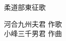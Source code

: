 \documentclass[10pt,b5j]{tarticle} %
\begin{document}
\begin{minipage}[c]{0.7\hsize} %
    \begin{center}
        {\LARGE
            柔道部東征歌 %
        }
        {\small 
        }
    \end{center}
\end{minipage}
\begin{minipage}[c]{0.3\hsize} %
    \begin{flushright} %
        河合九州夫君 作歌\\小峰三千男君 作曲 %
    \end{flushright}
\end{minipage}
\end{document}
